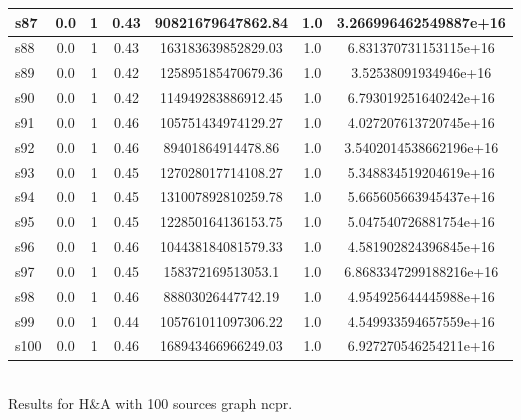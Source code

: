 \documentclass{article}
\begin{document}
\begin{tabular}{|l|c|c|c|c|c|c|}
\hline
s87 &0.0 & 1 & 0.43 & 90821679647862.84 & 1.0 & 3.266996462549887e+16\\
\hline
s88 &0.0 & 1 & 0.43 & 163183639852829.03 & 1.0 & 6.831370731153115e+16\\
\hline
s89 &0.0 & 1 & 0.42 & 125895185470679.36 & 1.0 & 3.52538091934946e+16\\
\hline
s90 &0.0 & 1 & 0.42 & 114949283886912.45 & 1.0 & 6.793019251640242e+16\\
\hline
s91 &0.0 & 1 & 0.46 & 105751434974129.27 & 1.0 & 4.027207613720745e+16\\
\hline
s92 &0.0 & 1 & 0.46 & 89401864914478.86 & 1.0 & 3.5402014538662196e+16\\
\hline
s93 &0.0 & 1 & 0.45 & 127028017714108.27 & 1.0 & 5.348834519204619e+16\\
\hline
s94 &0.0 & 1 & 0.45 & 131007892810259.78 & 1.0 & 5.665605663945437e+16\\
\hline
s95 &0.0 & 1 & 0.45 & 122850164136153.75 & 1.0 & 5.047540726881754e+16\\
\hline
s96 &0.0 & 1 & 0.46 & 104438184081579.33 & 1.0 & 4.581902824396845e+16\\
\hline
s97 &0.0 & 1 & 0.45 & 158372169513053.1 & 1.0 & 6.8683347299188216e+16\\
\hline
s98 &0.0 & 1 & 0.46 & 88803026447742.19 & 1.0 & 4.954925644445988e+16\\
\hline
s99 &0.0 & 1 & 0.44 & 105761011097306.22 & 1.0 & 4.549933594657559e+16\\
\hline
s100 &0.0 & 1 & 0.46 & 168943466966249.03 & 1.0 & 6.927270546254211e+16\\
\hline
\end{tabular}\\

\noindent Results for H\&A with 100 sources graph ncpr.
\end{document}
